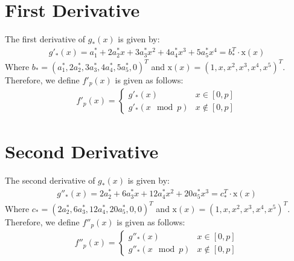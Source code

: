 \section{First Derivative}
The first derivative of $g_*\left(x\right)$ is given by:
\begin{equation}\label{eq:polynomial_6}
\begin{split}
g'_*\left(x\right) = a^*_1 + 2a^*_2x + 3a^*_3x^2 + 4a^*_4x^3 + 5a^*_5x^4 = b_*^T \cdot \mathrm{x}\left(x\right)
\end{split}
\end{equation}
Where $b_* = \left(a^*_1,2a^*_2,3a^*_3,4a^*_4,5a^*_5,0\right)^T$ and $\mathrm{x}\left(x\right) = \left(1,x,x^2,x^3,x^4,x^5\right)^T$. Therefore, we define $f'_p\left(x\right)$ is given as follows:
\begin{equation}\label{eq:polynomial_6}
\begin{split}
f'_p\left(x\right) = 
\begin{cases} 
  g'_*\left(x\right) & x \in \left[0,p\right] \\
  g'_*\left(x \mod{p}\right) & x \notin \left[0,p\right]
\end{cases}
\end{split}
\end{equation}
\section{Second Derivative}
The second derivative of $g_*\left(x\right)$ is given by:
\begin{equation}\label{eq:polynomial_6}
\begin{split}
g''_*\left(x\right) = 2a^*_2 + 6a^*_3x + 12a^*_4x^2 + 20a^*_5x^3 = c_*^T \cdot \mathrm{x}\left(x\right)
\end{split}
\end{equation}
Where $c_* = \left(2a^*_2,6a^*_3, 12a^*_4,20a^*_5,0,0\right)^T$ and $\mathrm{x}\left(x\right) = \left(1,x,x^2,x^3,x^4,x^5\right)^T$. Therefore, we define $f''_p\left(x\right)$ is given as follows:
\begin{equation}\label{eq:polynomial_6}
\begin{split}
f''_p\left(x\right) = 
\begin{cases} 
  g''_*\left(x\right) & x \in \left[0,p\right] \\
  g''_*\left(x \mod{p}\right) & x \notin \left[0,p\right]
\end{cases}
\end{split}
\end{equation}
